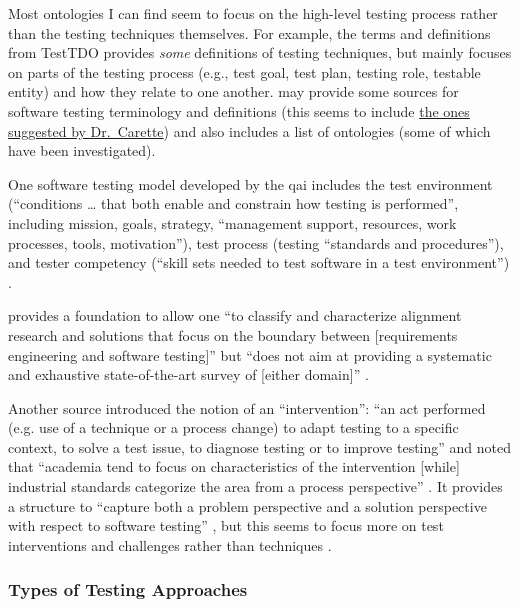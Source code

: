 Most ontologies I can find seem to focus on the high-level testing process
rather than the testing techniques themselves. For example, the terms and
definitions \citep{TebesEtAl2020b}
from TestTDO \citep{TebesEtAl2020a} provides \emph{some} definitions of
testing techniques, but mainly focuses on parts of the testing process
(e.g., test goal, test plan, testing role, testable entity) and how they relate
to one another. \citep[pp.~152-153]{TebesEtAl2019} may provide some
sources for software testing terminology and definitions (this seems to include
\href{https://github.com/samm82/TestGen-Thesis/issues/14#issuecomment-1839922715}
{the ones suggested by Dr.~Carette}) and also includes a list of ontologies
(some of which have been investigated).

One software testing model developed by the \acf{qai} includes the test
environment (``conditions \dots
that both enable and constrain how testing is performed'', including mission,
goals, strategy, ``management support, resources, work processes, tools,
motivation''), test process (testing ``standards and procedures''), and tester
competency (``skill sets needed to test software in a test environment'')
\citep[pp.~5-6]{Perry2006}.

\citep{UnterkalmsteinerEtAl2014} provides a foundation to allow one ``to
classify and characterize alignment research and solutions that focus on the
boundary between [requirements engineering and software testing]'' but ``does
not aim at providing a systematic and exhaustive state-of-the-art survey of
      [either domain]'' \citep[p.~A:2]{UnterkalmsteinerEtAl2014}.

Another source
introduced the notion of an ``intervention'': ``an act performed (e.g. use of a
technique or a process change) to adapt testing to a specific context, to solve
a test issue, to diagnose testing or to improve testing''
\citep[p.~1]{engström_mapping_2015} and noted that ``academia tend to focus on
characteristics of the intervention [while] industrial standards categorize the
area from a process perspective'' \citep[p.~2]{engström_mapping_2015}.
It provides a structure to ``capture both a problem perspective and a solution
perspective with respect to software testing'' \citep[pp.~3-4]{engström_mapping_2015},
but this seems to focus more on test interventions and challenges rather than
techniques \citep[Fig.~5]{engström_mapping_2015}.

\subsubsection{Types of Testing Approaches}

